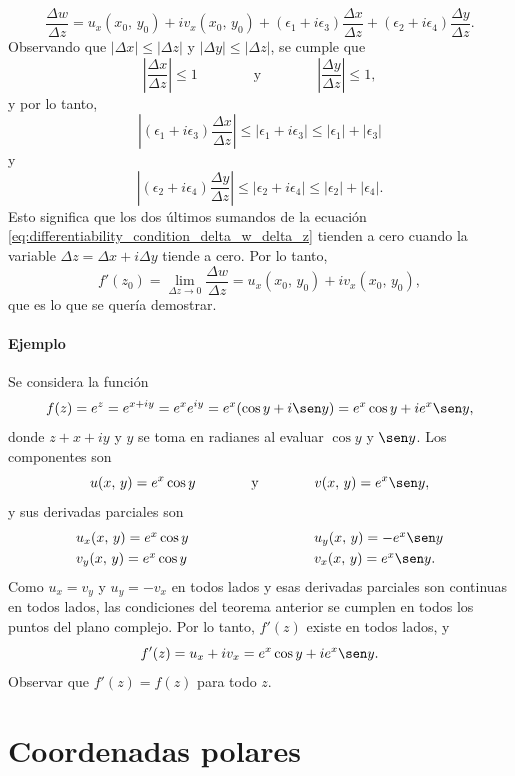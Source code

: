 \documentclass[a4paper]{report}
\begin{document}
\begin{equation}\label{eq:differentiability_condition_delta_w_delta_z}
 \frac{\Delta w}{\Delta z}=u_x(x_0,\,y_0)+iv_x(x_0,\,y_0)+(\epsilon_1+i\epsilon_3)\frac{\Delta x}{\Delta z}+(\epsilon_2+i\epsilon_4)\frac{\Delta y}{\Delta z}.
\end{equation}
Observando que \(|\Delta x|\leq|\Delta z|\) y \(|\Delta y|\leq|\Delta z|\), se cumple que 
\[
 \left|\frac{\Delta x}{\Delta z}\right|\leq1
 \qquad\qquad\textrm{y}\qquad\qquad
 \left|\frac{\Delta y}{\Delta z}\right|\leq1,
\]
y por lo tanto,
\[
 \left|(\epsilon_1+i\epsilon_3)\frac{\Delta x}{\Delta z}\right|\leq|\epsilon_1+i\epsilon_3|\leq|\epsilon_1|+|\epsilon_3|
\]
y
\[
 \left|(\epsilon_2+i\epsilon_4)\frac{\Delta y}{\Delta z}\right|\leq|\epsilon_2+i\epsilon_4|\leq|\epsilon_2|+|\epsilon_4|.
\]
Esto significa que los dos últimos sumandos de la ecuación \ref{eq:differentiability_condition_delta_w_delta_z} tienden a cero cuando la variable \(\Delta z=\Delta x+i\Delta y\) tiende a cero. Por lo tanto,
\[
 f'(z_0)=\lim_{\Delta z\to0}\frac{\Delta w}{\Delta z}=u_x(x_0,\,y_0)+iv_x(x_0,\,y_0),
\]
que es lo que se quería demostrar.

\paragraph{Ejemplo} Se considera la función
\[
 f(z)=e^z=e^{x+iy}=e^xe^{iy}=e^x(\cos y+i\sen y)=e^x\cos y+ie^x\sen y,
\]
donde \(z+x+iy\) y \(y\) se toma en radianes al evaluar \(\cos y\) y \(\sen y\). Los componentes son 
 \[
  u(x,\,y)=e^x\cos y
  \qquad\qquad\textrm{y}\qquad\qquad
  v(x,\,y)=e^x\sen y,
 \]
y sus derivadas parciales son 
\[
 \begin{array}{ll}
  u_x(x,\,y)=e^x\cos y\qquad\qquad\qquad\qquad&u_y(x,\,y)=-e^x\sen y\\[\smallskipamount]
  v_y(x,\,y)=e^x\cos y\qquad\qquad\qquad\qquad&v_x(x,\,y)=e^x\sen y.
 \end{array}
\] 
Como \(u_x=v_y\) y \(u_y=-v_x\) en todos lados y esas derivadas parciales son continuas en todos lados, las condiciones del teorema anterior se cumplen en todos los puntos del plano complejo. Por lo tanto, \(f'(z)\) existe en todos lados, y
\[
 f'(z)=u_x+iv_x=e^x\cos y+ie^x\sen y.
\]
Observar que \(f'(z)=f(z)\) para todo \(z\).

\section{Coordenadas polares}\label{sec:cauchy_riemann_equations_polar}
\end{document}
